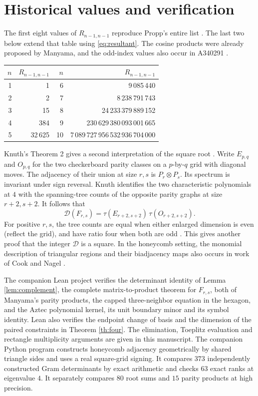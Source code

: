 \documentclass[11pt,letterpaper]{article}
\newcommand{\Gram}{\mathcal D}
\begin{document}
\section{Historical values and verification}
The first eight values of \(R_{n-1,n-1}\) reproduce Propp's entire list \cite[p.~283]{propp}. The last two below extend that table using \eqref{eq:resultant}. The cosine products were already proposed by Manyama, and the odd-index values also occur in A340291 \cite{oeis}.
\begin{center}
\begin{tabular}{@{}r r @{\qquad\qquad}r r@{}}
\toprule \(n\)&\(R_{n-1,n-1}\)&\(n\)&\(R_{n-1,n-1}\)\\\midrule
1&1&6&9\,085\,440\\
2&2&7&8\,238\,791\,743\\
3&15&8&24\,233\,379\,889\,152\\
4&384&9&230\,629\,380\,093\,001\,665\\
5&32\,625&10&7\,089\,727\,956\,532\,936\,704\,000\\\bottomrule
\end{tabular}
\end{center}
Knuth's Theorem 2 gives a second interpretation of the square root \cite{knuth}. Write \(E_{p,q}\) and \(O_{p,q}\) for the two checkerboard parity classes on a \(p\)-by-\(q\) grid with diagonal moves. The adjacency of their union at size \(r,s\) is \(P_r\otimes P_s\). Its spectrum is invariant under sign reversal. Knuth identifies the two characteristic polynomials at \(4\) with the spanning-tree counts of the opposite parity graphs at size \(r+2,s+2\). It follows that
\[
 \Gram(F_{r,s})=\tau(E_{r+2,s+2})\,\tau(O_{r+2,s+2}).
\]
For positive \(r,s\), the tree counts are equal when either enlarged dimension is even (reflect the grid), and have ratio four when both are odd \cite[Cor.~2]{knuth}. This gives another proof that the integer \(\Gram\) is a square. In the honeycomb setting, the monomial description of triangular regions and their biadjacency maps also occurs in work of Cook and Nagel \cite{cook}.

The companion Lean project verifies the determinant identity of Lemma \ref{lem:complement}, the complete matrix-to-product theorem for \(F_{r,s}\), both of Manyama's parity products, the capped three-neighbor equation in the hexagon, and the Aztec polynomial kernel, its unit boundary minor and its symbol identity. Lean also verifies the endpoint change of basis and the dimension of the paired constraints in Theorem \ref{th:four}. The elimination, Toeplitz evaluation and rectangle multiplicity arguments are given in this manuscript. The companion Python program constructs honeycomb adjacency geometrically by shared triangle sides and uses a real square-grid signing. It compares \(373\) independently constructed Gram determinants by exact arithmetic and checks \(63\) exact ranks at eigenvalue \(4\). It separately compares \(80\) root sums and \(15\) parity products at high precision.
\end{document}
